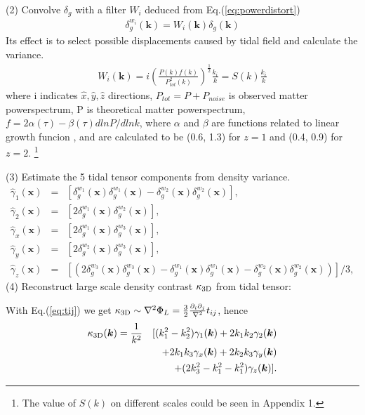 (2) Convolve $\delta_g$ with a filter $W_i$ 
deduced from Eq.(\ref{eq:powerdistort}) 
\begin{eqnarray}
\delta^{w_i}_g(\bm{k})=W_i(\bm{k})\delta_g(\bm{k}) 
\end{eqnarray}
Its effect is to select possible displacements caused by tidal field and calculate the variance.
\begin{eqnarray}
\label{eq:wi}
W_i(\bm{k})=i (\frac{P(k)f(k)}{P_{tot}^2(k)})^{\frac{1}{2}}\frac{k_i}{k}
=S(k)\frac{k_i}{k}\nonumber
\end{eqnarray}
where i indicates $\hat x,\hat y,\hat z$ directions, 
$P_{tot}=P+P_{noise}$ is observed matter powerspectrum, 
P is theoretical matter powerspectrum,
$f=2\alpha(\tau)-\beta(\tau)dlnP/dlnk$, 
where $\alpha$ and $\beta$ are functions related to linear growth funcion \cite{2015:zhu}, 
and are calculated to be (0.6, 1.3) for $z=1$ and (0.4, 0.9) for $z=2$.
\footnote{The value of $S(k)$ on different scales could be seen in Appendix 1.}

(3) Estimate the 5 tidal tensor components from density variance.
\begin{eqnarray}
\label{eq:gamma}
\hat{\gamma}_1(\bm{x})&=&
[{\delta}^{w_1}_g(\bm{x}){\delta}^{w_1}_g(\bm{x})-
{\delta}^{w_2}_g(\bm{x}){\delta}^{w_2}_g(\bm{x})],\nonumber\\
\hat{\gamma}_2(\bm{x})&=&
[2{\delta}^{w_1}_g(\bm{x}){\delta}^{w_2}_g(\bm{x})],\nonumber\\
\hat{\gamma}_x(\bm{x})&=&
[2{\delta}^{w_1}_g(\bm{x}){\delta}^{w_3}_g(\bm{x})],\\
\hat{\gamma}_y(\bm{x})&=&
[2{\delta}^{w_2}_g(\bm{x}){\delta}^{w_3}_g(\bm{x})],\nonumber\\
\hat{\gamma}_z(\bm{x})&=&
[(2{\delta}^{w_3}_g(\bm{x}){\delta}^{w_3}_g(\bm{x})-
{\delta}^{w_1}_g(\bm{x}){\delta}^{w_1}_g(\bm{x})-
{\delta}^{w_2}_g(\bm{x}){\delta}^{w_2}_g(\bm{x}))]/3,\nonumber
\end{eqnarray}
(4) Reconstruct large scale density contrast $\kappa_\mathrm{3D}$ from tidal tensor:


With Eq.(\ref{eq:tij}) we get 
$\kappa_\mathrm{3D}\sim\nabla^2\Phi_L=\frac{3}{2}\frac{\partial_i\partial_j}{\nabla^2}t_{ij}$, hence
\begin{eqnarray}
\kappa_\mathrm{3D}(\bm{k})=\frac{1}{k^2}
&&[(k_1^2-k_2^2)\gamma_1(\bm{k})+2k_1k_2\gamma_2(\bm{k})\nonumber\\
&&+2k_1k_3\gamma_x(\bm{k})+2k_2k_3\gamma_y(\bm{k})\\\nonumber
&&+(2k_3^2-k_1^2-k_1^2)\gamma_z(\bm{k})].
\end{eqnarray}

